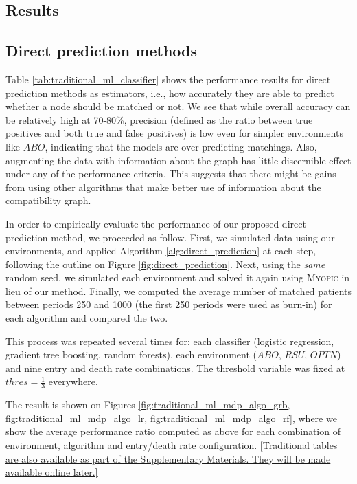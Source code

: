 \begin{itemize}

\section{Results}

\subsection{Direct prediction methods} 

Table \ref{tab:traditional_ml_classifier} shows the performance results for direct prediction methods as estimators, i.e., how accurately they are able to predict whether a node should be matched or not. We see that while overall accuracy can be relatively high at 70-80\%, precision (defined as the ratio between true positives and both true and false positives) is low even for simpler environments like $ABO$, indicating that the models are over-predicting matchings. Also, augmenting the data with information about the graph has little discernible effect under any of the performance criteria. This suggests that there might be gains from using other algorithms that make better use of information about the compatibility graph. 

In order to empirically evaluate the performance of our proposed direct prediction method, we proceeded as follow. First, we simulated data using our environments, and applied Algorithm \ref{alg:direct_prediction} at each step, following the outline on Figure \ref{fig:direct_prediction}. Next, using the \emph{same} random seed, we simulated each environment and solved it again using \textsc{Myopic} in lieu of our method. Finally, we computed the average number of matched patients between periods 250 and 1000 (the first 250 periods were used as burn-in) for each algorithm and compared the two. 

This process was repeated several times for: each classifier (logistic regression, gradient tree boosting, random forests), each environment ($ABO$, $RSU$, $OPTN$) and nine entry and death rate combinations. The threshold variable was fixed at $thres = \frac{1}{3}$ everywhere.

The result is shown on Figures \ref{fig:traditional_ml_mdp_algo_grb, fig:traditional_ml_mdp_algo_lr, fig:traditional_ml_mdp_algo_rf}, where we show the average performance ratio computed as above for each combination of environment, algorithm and entry/death rate configuration. \ref{Traditional tables are also available as part of the Supplementary Materials. They will be made available online later.}


\end{itemize}

